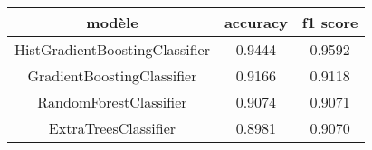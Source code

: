 \begin{tabular}{|c|c|c|}
\hline
modèle & accuracy & f1 score\\ 
 \hline 
HistGradientBoostingClassifier & 0.9444 & 0.9592\\ 
 \hline 
GradientBoostingClassifier & 0.9166 & 0.9118\\ 
 \hline 
RandomForestClassifier & 0.9074 & 0.9071\\ 
 \hline 
ExtraTreesClassifier & 0.8981 & 0.9070\\ 
 \hline 
\end{tabular}